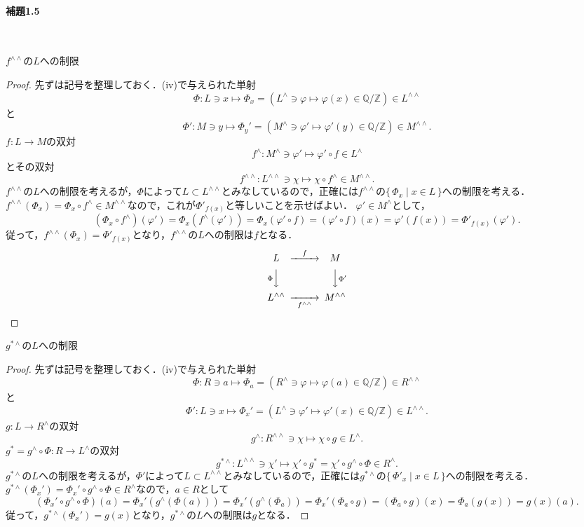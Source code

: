 \paragraph{補題1.5}~
\begin{screen}
  $f^{\wedge\wedge}$の$L$への制限
\end{screen}
\begin{proof}
  先ずは記号を整理しておく．(iv)で与えられた単射
  \[ \Phi \colon L \ni x \mapsto \Phi_x = (L^\wedge \ni \varphi \mapsto \varphi(x) \in \mathbb{Q}/\mathbb{Z}) \in L^{\wedge\wedge} \]
  と
  \[ \Phi' \colon M \ni y \mapsto \Phi_y' = (M^\wedge \ni \varphi' \mapsto \varphi'(y) \in \mathbb{Q}/\mathbb{Z}) \in M^{\wedge\wedge} .\]
  $f\colon L \to M$の双対
  \[ f^\wedge \colon M^\wedge \ni \varphi' \mapsto \varphi' \circ f \in L^\wedge \]
  とその双対
  \[ f^{\wedge\wedge} \colon L^{\wedge\wedge} \ni \chi \mapsto \chi \circ f^\wedge \in M^{\wedge\wedge}. \]
  $f^{\wedge\wedge}$の$L$への制限を考えるが，$\Phi$によって$L \subset L^{\wedge\wedge}$とみなしているので，正確には$f^{\wedge\wedge}$の$\{\, \Phi_x \mid x \in L \,\}$への制限を考える．
  $f^{\wedge\wedge}(\Phi_x) = \Phi_x \circ f^\wedge \in M^{\wedge\wedge}$なので，これが$\Phi'_{f(x)}$と等しいことを示せばよい．
  $\varphi' \in M^\wedge$として，
  \[ (\Phi_x \circ f^\wedge)(\varphi') = \Phi_x(f^\wedge(\varphi')) = \Phi_x(\varphi' \circ f) = (\varphi' \circ f)(x) = \varphi'(f(x)) = \Phi'_{f(x)}(\varphi'). \]
  従って，$f^{\wedge\wedge}(\Phi_x) = \Phi'_{f(x)}$となり，$f^{\wedge\wedge}$の$L$への制限は$f$となる．
  \[
  \begin{CD}
    L @>{f}>> M \\
    @V{\Phi}VV  @VV{\Phi'}V \\
    L^{\wedge\wedge} @>>{f^{\wedge\wedge}}> M^{\wedge\wedge}
  \end{CD}
  \]
\end{proof}

\begin{screen}
  $g^{\ast\wedge}$の$L$への制限
\end{screen}
\begin{proof}
  先ずは記号を整理しておく．(iv)で与えられた単射
  \[ \Phi \colon R \ni a \mapsto \Phi_a = (R^\wedge \ni \varphi \mapsto \varphi(a) \in \mathbb{Q}/\mathbb{Z}) \in R^{\wedge\wedge} \]
  と
  \[ \Phi' \colon L \ni x \mapsto \Phi_x' = (L^\wedge \ni \varphi' \mapsto \varphi'(x) \in \mathbb{Q}/\mathbb{Z}) \in L^{\wedge\wedge}. \]
  $g \colon L \to R^\wedge$の双対
  \[ g^\wedge \colon R^{\wedge\wedge} \ni \chi \mapsto \chi \circ g \in L^\wedge. \]
  $g^\ast = g^\wedge \circ \Phi \colon R \to L^\wedge$の双対
  \[ g^{\ast\wedge} \colon L^{\wedge\wedge} \ni \chi' \mapsto \chi' \circ g^\ast = \chi' \circ g^\wedge \circ \Phi \in R^\wedge. \]
  $g^{\ast\wedge}$の$L$への制限を考えるが，$\Phi'$によって$L \subset L^{\wedge\wedge}$とみなしているので，正確には$g^{\ast\wedge}$の$\{\, \Phi'_x \mid x \in L \,\}$への制限を考える．
  $g^{\ast\wedge}(\Phi_x') = \Phi_x' \circ g^\wedge \circ \Phi \in R^\wedge$なので，$a \in R$として
  \[ (\Phi_x' \circ g^\wedge \circ \Phi)(a) = \Phi_x'(g^\wedge(\Phi(a))) = \Phi_x'(g^\wedge(\Phi_a)) = \Phi_x'(\Phi_a \circ g) = (\Phi_a \circ g)(x) = \Phi_a(g(x)) = g(x)(a).\]
  従って，$g^{\ast\wedge}(\Phi_x') = g(x)$となり，$g^{\ast\wedge}$の$L$への制限は$g$となる．
\end{proof}
